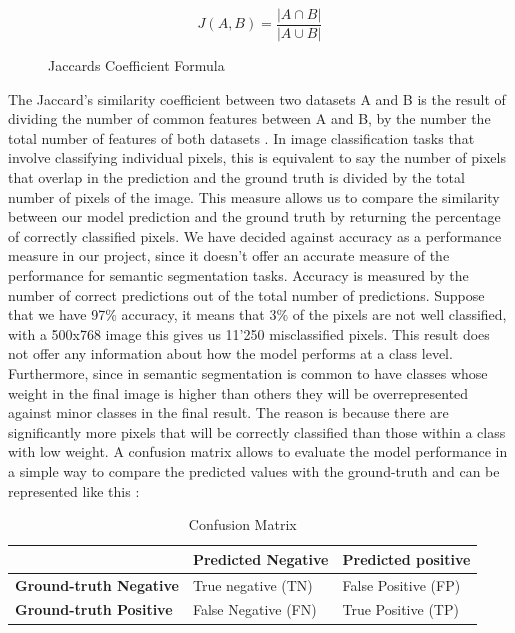 \documentclass[12pt,a4paper]{scrartcl}
\begin{document}
\begin{figure}[H]
   \[ J(A,B) = \frac{|A\cap B|}{|A\cup B|}\]
   \caption{Jaccards Coefficient Formula}
\end{figure}

The Jaccard's similarity coefficient between two datasets A and B is the result of dividing the number of common features between A and B, by the number the total number of features of both datasets \cite{Niwattanakul2013}.
In image classification tasks that involve classifying individual pixels, this is equivalent to say the number of pixels that overlap in the prediction and the ground truth is divided by the total number of pixels of the image. This measure allows us to compare the similarity between our model prediction and the ground truth by returning the percentage of correctly classified pixels. 
We have decided against accuracy as a performance measure in our project, since it doesn't offer an accurate measure of the performance for semantic segmentation tasks. Accuracy is measured by the number of correct predictions out of the total number of predictions. Suppose that we have 97\% accuracy, it means that 3\% of the pixels are not well classified, with a 500x768 image this gives us 11'250 misclassified pixels. This result does not offer any information about how the model performs at a class level. Furthermore, since in semantic segmentation is common to have classes whose weight in the final image is higher than others they will be overrepresented against minor classes in the final result. The reason is because there are significantly more pixels that will be correctly classified than those within a class with low weight. 
A confusion matrix allows to evaluate the model performance in a simple way to compare the predicted values with the ground-truth and can be represented like this \cite{ConfusionMatrix}:
    \begin{table}[H]
        \begin{tabular}{lll}
        \cline{2-3}
            \multicolumn{1}{l|}{}                                 & \multicolumn{1}{l|}{\textbf{Predicted Negative}} & \multicolumn{1}{l|}{\textbf{Predicted positive}} \\ \hline
            \multicolumn{1}{|l|}{\textbf{Ground-truth Negative}} & \multicolumn{1}{l|}{True negative (TN)}          & \multicolumn{1}{l|}{False Positive (FP)}         \\ \hline
            \multicolumn{1}{|l|}{\textbf{Ground-truth Positive}}  & \multicolumn{1}{l|}{False Negative (FN)}         & \multicolumn{1}{l|}{True Positive (TP)}          \\ \hline
        \end{tabular}
        \caption{Confusion Matrix}
    \end{table}
\end{document}
